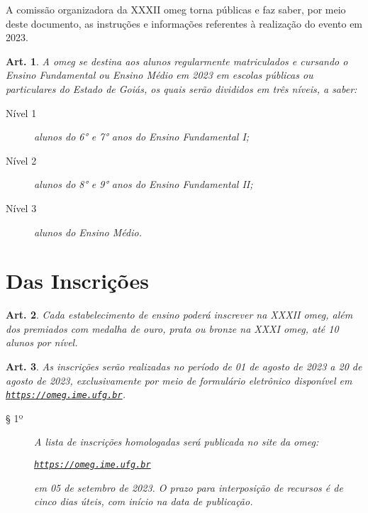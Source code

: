 \documentclass[a4paper,12pt]{article}
\newtheorem{article}{Art.}
\def\url{https://omeg.ime.ufg.br}
\def\homepage{\href{\url}{\texttt{\url}}}
\def\previousEdition{XXXI}
\def\currentEdition{XXXII}
\def\year{2023}
\def\registrationOpening{01 de agosto de \year}
\def\registrationClosing{20 de agosto de \year}
\def\publicationOfAprovedRegistrations{05 de setembro de \year}
\begin{document}
A comissão organizadora da \currentEdition{} \acrfull{omeg} torna públicas e
faz saber, por meio deste documento, as instruções e informações referentes à
realização do evento em \year.

\begin{article}
  A \acrshort{omeg} se destina aos alunos regularmente matriculados e cursando
  o Ensino Fundamental ou Ensino Médio em \year{} em escolas públicas ou
  particulares do Estado de Goiás, os quais serão divididos em três níveis, a
  saber:
  \begin{description}
    \item[Nível 1] alunos do 6° e 7° anos do Ensino Fundamental I;
    \item[Nível 2] alunos do 8° e 9° anos do Ensino Fundamental II;
    \item[Nível 3] alunos do Ensino Médio.
  \end{description}
\end{article}

\section*{Das Inscrições}

\begin{article}
  Cada estabelecimento de ensino poderá inscrever na \currentEdition{}
  \acrshort{omeg}, além dos premiados com medalha de ouro, prata ou bronze na
  \previousEdition{} \acrshort{omeg}, até 10 alunos por nível.
\end{article}

\begin{article}
  As inscrições serão realizadas no período de \registrationOpening{} a
  \registrationClosing, exclusivamente por meio de formulário eletrônico
  disponível em \homepage.
  \begin{description}
    \item[§ 1º]
      A lista de inscrições homologadas será publicada no site da
      \acrshort{omeg}:
      \begin{center}
        \homepage
      \end{center}
      em \publicationOfAprovedRegistrations{}. O prazo para interposição de
      recursos é de cinco dias úteis, com início na data de publicação.
  \end{description}
\end{article}
\end{document}
